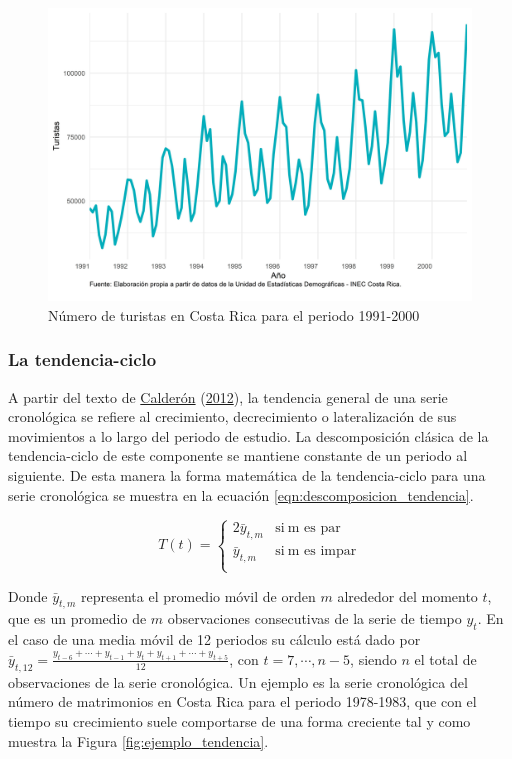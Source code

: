 \documentclass[
]{article}
\begin{document}
\begin{figure}[H]
\includegraphics[width=1\linewidth,height=1\textheight]{Tesis_files/figure-latex/ejemplo_multiplicativa-1} \caption{Número de turistas en Costa Rica para el periodo 1991-2000}\label{fig:ejemplo_multiplicativa}
\end{figure}

\subsubsection{La tendencia-ciclo}

A partir del texto de
\protect\hyperlink{ref-calderon2012estadistica}{Calderón}
(\protect\hyperlink{ref-calderon2012estadistica}{2012}), la tendencia
general de una serie cronológica se refiere al crecimiento,
decrecimiento o lateralización de sus movimientos a lo largo del periodo
de estudio. La descomposición clásica de la tendencia-ciclo de este
componente se mantiene constante de un periodo al siguiente. De esta
manera la forma matemática de la tendencia-ciclo para una serie
cronológica se muestra en la ecuación
\ref{eqn:descomposicion_tendencia}.

\begin{equation}
\label{eqn:descomposicion_tendencia}
T(t)=
\begin{cases}
2\bar y_{t,m} & \text{si}\ \text{m es par} \\
\bar y_{t, m} & \text{si}\ \text{m es impar} \\
\end{cases}
\end{equation}

Donde \(\bar y_{t,m}\) representa el promedio móvil de orden \(m\)
alrededor del momento \(t\), que es un promedio de \(m\) observaciones
consecutivas de la serie de tiempo \(y_t\). En el caso de una media
móvil de 12 periodos su cálculo está dado por
\(\bar{y}_{t, 12}=\frac{y_{t-6}+\cdots+y_{t-1}+y_t+y_{t+1}+\cdots+y_{t+5}}{12}\),
con \(t=7,\cdots,n-5\), siendo \(n\) el total de observaciones de la
serie cronológica. Un ejemplo es la serie cronológica del número de
matrimonios en Costa Rica para el periodo 1978-1983, que con el tiempo
su crecimiento suele comportarse de una forma creciente tal y como
muestra la Figura \ref{fig:ejemplo_tendencia}.
\end{document}

